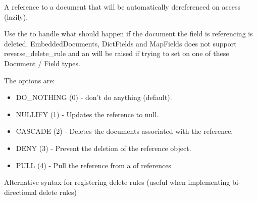 \documentclass[letterpaper,10pt,english]{sphinxmanual}
\begin{document}
\begin{fulllineitems}
\begin{fulllineitems}
\end{fulllineitems}


\begin{fulllineitems}
\label{\detokenize{item_response:item_response.ItemResponse.item}}
A reference to a document that will be automatically dereferenced on
access (lazily).

Use the  to handle what should happen if the document
the field is referencing is deleted.  EmbeddedDocuments, DictFields and
MapFields does not support reverse\_delete\_rule and an 
will be raised if trying to set on one of these Document / Field types.

The options are:
\begin{itemize}
\item {} 
DO\_NOTHING (0)  - don't do anything (default).

\item {} 
NULLIFY    (1)  - Updates the reference to null.

\item {} 
CASCADE    (2)  - Deletes the documents associated with the reference.

\item {} 
DENY       (3)  - Prevent the deletion of the reference object.

\item {} 
PULL       (4)  - Pull the reference from a  of references

\end{itemize}

Alternative syntax for registering delete rules (useful when implementing
bi-directional delete rules)

\begin{sphinxVerbatim}[commandchars=\\\{\}]
 
      
      

  
\end{sphinxVerbatim}


\end{fulllineitems}
\end{fulllineitems}
\end{document}

